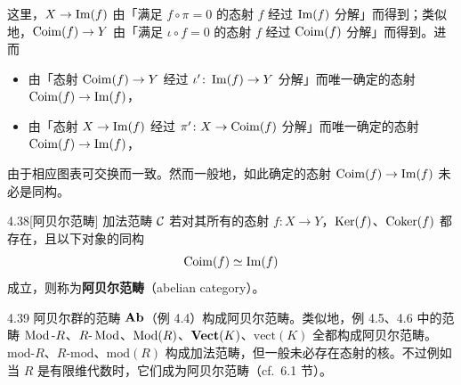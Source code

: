 这里，$X\to\operatorname{Im}(f)$ 由「满足 $f\circ\pi=0$ 的态射 $f$ 经过 $\operatorname{Im}(f)$ 分解」而得到；类似地，$\operatorname{Coim}(f)\to Y$ 由「满足 $\iota\circ f=0$ 的态射 $f$ 经过 $\operatorname{Coim}(f)$ 分解」而得到。进而
\begin{itemize}
  \item 由「态射 $\operatorname{Coim}(f)\to Y$ 经过 $\iota'\colon\operatorname{Im}(f)\to Y$ 分解」而唯一确定的态射 $\operatorname{Coim}(f)\to\operatorname{Im}(f)$，
  \item 由「态射 $X\to\operatorname{Im}(f)$ 经过 $\pi'\colon X\to\operatorname{Coim}(f)$ 分解」而唯一确定的态射 $\operatorname{Coim}(f)\to\operatorname{Im}(f)$，
\end{itemize}
由于相应图表可交换而一致。然而一般地，如此确定的态射 $\operatorname{Coim}(f)\to\operatorname{Im}(f)$ 未必是同构。

\begin{definition}{4.38}[阿贝尔范畴]
加法范畴 $\mathcal{C}$ 若对其所有的态射 $f\colon X\to Y$，$\operatorname{Ker}(f)$、$\operatorname{Coker}(f)$ 都存在，且以下对象的同构
\[ \operatorname{Coim}(f)\simeq\operatorname{Im}(f) \]
成立，则称为\textbf{阿贝尔范畴}（abelian category）。
\end{definition}

\begin{example}{4.39}
阿贝尔群的范畴 $\mathbf{Ab}$（例 4.4）构成阿贝尔范畴。类似地，例 4.5、4.6 中的范畴 $\operatorname{Mod}\text{-}R$、$R\text{-}\operatorname{Mod}$、$\operatorname{Mod}(R)$、$\mathbf{Vect}(K)$、$\mathrm{vect}(K)$ 全都构成阿贝尔范畴。$\mathrm{mod}\text{-}R$、$R\text{-}\mathrm{mod}$、$\mathrm{mod}(R)$ 构成加法范畴，但一般未必存在态射的核。不过例如当 $R$ 是有限维代数时，它们成为阿贝尔范畴（cf.\ 6.1 节）。
\end{example}

